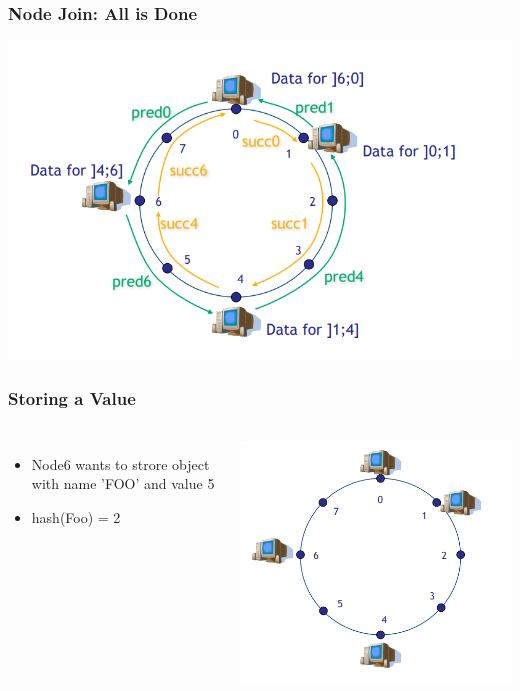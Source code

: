\begin{frame}
    \frametitle{Node Join: All is Done}
    \includegraphics[scale=0.3]{figures/chord5.png}
\end{frame}

\begin{frame}
    \frametitle{Storing a Value}
    \begin{columns}
        \begin{itemize}
            \item Node6 wants to strore object with name 'FOO' and value 5
            \item hash(Foo) = 2
        \end{itemize}
            \includegraphics[scale=0.26]{figures/chord6.png}
    \end{columns}
\end{frame}

